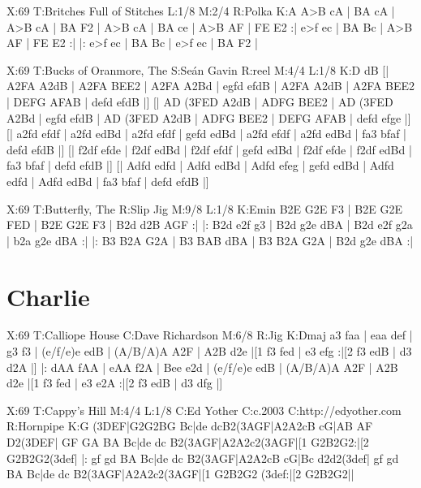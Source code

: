 \documentclass{article}
\begin{document}
\begin{abc}[name]
X:69
T:Britches Full of Stitches
L:1/8
M:2/4
R:Polka
K:A
A>B cA | BA cA | A>B cA | BA F2 |
A>B cA | BA ce | A>B AF | FE E2 :|
e>f ec | BA Bc | A>B AF | FE E2 :|
|: e>f ec | BA Bc | e>f ec | BA F2 |
\end{abc}

\begin{abc}[name]
X:69
T:Bucks of Oranmore, The
S:Seán Gavin
R:reel
M:4/4
L:1/8
K:D
dB [| A2FA A2dB | A2FA BEE2 | A2FA A2Bd | egfd efdB |
A2FA A2dB | A2FA BEE2 | DEFG AFAB | defd efdB |]
[| AD (3FED A2dB | ADFG  BEE2 | AD (3FED A2Bd | egfd efdB |
AD (3FED A2dB | ADFG  BEE2 | DEFG AFAB | defd efge |]
[| a2fd efdf | a2fd edBd | a2fd efdf | gefd edBd |
a2fd efdf | a2fd edBd | fa3 bfaf | defd efdB |]
[| f2df efde | f2df edBd | f2df efdf | gefd edBd |
f2df efde | f2df edBd | fa3 bfaf | defd efdB |]
[| Adfd edfd | Adfd edBd | Adfd efeg | gefd edBd |
Adfd edfd | Adfd edBd | fa3 bfaf | defd efdB |]
\end{abc}

\begin{abc}[name]
X:69
T:Butterfly, The
R:Slip Jig
M:9/8
L:1/8
K:Emin
B2E G2E F3 | B2E G2E FED | B2E G2E F3 | B2d d2B AGF :|
|: B2d e2f g3 | B2d g2e dBA | B2d e2f g2a | b2a g2e dBA :|
|: B3 B2A G2A | B3 BAB dBA | B3 B2A G2A | B2d g2e dBA :|
\end{abc}

\section{Charlie}

\begin{abc}[name]
X:69
T:Calliope House
C:Dave Richardson
M:6/8
R:Jig
K:Dmaj
a3 faa | eaa def | g3 f3 | (e/f/e)e edB |
(A/B/A)A A2F | A2B d2e |[1 f3 fed | e3 efg :|[2 f3 edB | d3 d2A |]
|: dAA fAA | eAA f2A | Bee e2d | (e/f/e)e edB | (A/B/A)A A2F |
A2B d2e |[1 f3 fed | e3 e2A :|[2 f3 edB | d3 dfg |]
\end{abc}

\begin{abc}[name]
X:69
T:Cappy's Hill
M:4/4
L:1/8
C:Ed Yother
C:c.2003
C:http://edyother.com
R:Hornpipe
K:G
(3DEF|G2G2BG Bc|de dcB2(3AGF|A2A2cB cG|AB AF D2(3DEF|
GF GA BA Bc|de dc B2(3AGF|A2A2c2(3AGF|[1 G2B2G2:|[2 G2B2G2(3def|
|: gf gd BA Bc|de dc B2(3AGF|A2A2cB cG|Bc d2d2(3def|
gf gd BA Bc|de dc B2(3AGF|A2A2c2(3AGF|[1 G2B2G2 (3def:|[2 G2B2G2||
\end{abc}
\end{document}
